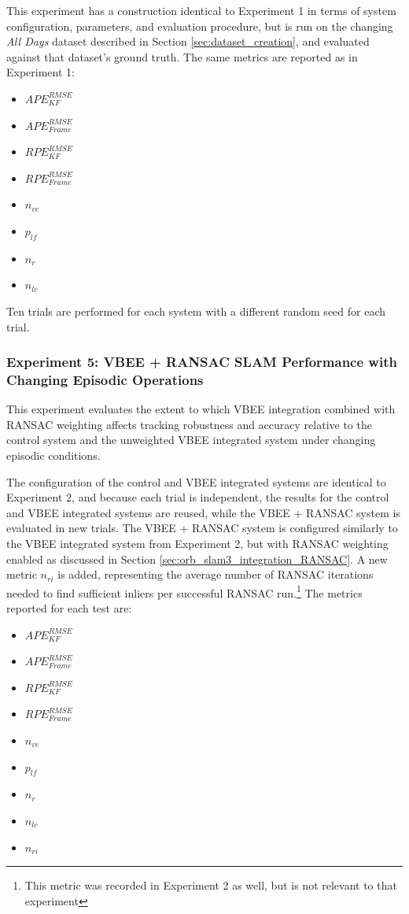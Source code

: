This experiment has a construction identical to Experiment 1 in terms of system configuration, parameters, and evaluation procedure, but is run on the changing \textit{All Days} dataset described in Section \ref{sec:dataset_creation}, and evaluated against that dataset's ground truth. The same metrics are reported as in Experiment 1:
\begin{itemize}
    \item $APE^{RMSE}_{KF}$
    \item $APE^{RMSE}_{Frame}$
    \item $RPE^{RMSE}_{KF}$
    \item $RPE^{RMSE}_{Frame}$
    \item $n_{ve}$
    \item $p_{lf}$
    \item $n_{r}$
    \item $n_{lc}$
\end{itemize}

Ten trials are performed for each system with a different random seed for each trial.

\subsubsection*{Experiment 5: VBEE + RANSAC SLAM Performance with Changing Episodic Operations}
This experiment evaluates the extent to which VBEE integration combined with RANSAC weighting affects tracking robustness and accuracy relative to the control system and the unweighted VBEE integrated system under changing episodic conditions.

The configuration of the control and VBEE integrated systems are identical to Experiment 2, and because each trial is independent, the results for the control and VBEE integrated systems are reused, while the VBEE + RANSAC system is evaluated in new trials. The VBEE + RANSAC system is configured similarly to the VBEE integrated system from Experiment 2, but with RANSAC weighting enabled as discussed in Section \ref{sec:orb_slam3_integration_RANSAC}. A new metric $n_{ri}$ is added, representing the average number of RANSAC iterations needed to find sufficient inliers per successful RANSAC run.\footnote{This metric was recorded in Experiment 2 as well, but is not relevant to that experiment} The metrics reported for each test are:
 \begin{itemize}
    \item $APE^{RMSE}_{KF}$
    \item $APE^{RMSE}_{Frame}$
    \item $RPE^{RMSE}_{KF}$
    \item $RPE^{RMSE}_{Frame}$
    \item $n_{ve}$
    \item $p_{lf}$
    \item $n_{r}$
    \item $n_{lc}$
    \item $n_{ri}$
\end{itemize}